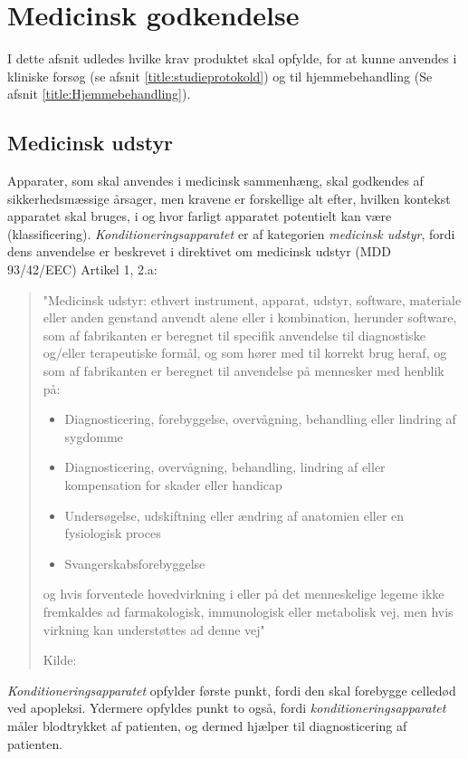 \section{Medicinsk godkendelse} \label{title:medGodkendelse}
I dette afsnit udledes hvilke krav produktet skal opfylde, for at kunne anvendes i kliniske forsøg (se afsnit \ref{title:studieprotokold}) og til hjemmebehandling (Se afsnit \ref{title:Hjemmebehandling}). 

\subsection{Medicinsk udstyr}
Apparater, som skal anvendes i medicinsk sammenhæng, skal godkendes af sikkerhedsmæssige årsager, men kravene er forskellige alt efter, hvilken kontekst apparatet skal bruges, i og hvor farligt apparatet potentielt kan være (klassificering). \textit{Konditioneringsapparatet} er af kategorien \textit{medicinsk udstyr}, fordi dens anvendelse er beskrevet i direktivet om medicinsk udstyr (MDD 93/42/EEC) Artikel 1, 2.a:

\begin{quote}
	"Medicinsk udstyr: ethvert instrument, apparat, udstyr, software,
	materiale eller anden genstand anvendt alene eller i kombination,
	herunder software, som af fabrikanten er beregnet til specifik anvendelse
	til diagnostiske og/eller terapeutiske formål, og som hører med
	til korrekt brug heraf, og som af fabrikanten er beregnet til anvendelse
	på mennesker med henblik på:
	\begin{itemize}
		\item Diagnosticering, forebyggelse, overvågning, behandling eller
		lindring af sygdomme
		\item Diagnosticering, overvågning, behandling, lindring af eller
		kompensation for skader eller handicap
		\item Undersøgelse, udskiftning eller ændring af anatomien eller en
		fysiologisk proces
		\item Svangerskabsforebyggelse
	\end{itemize}
	
	og hvis forventede hovedvirkning i eller på det menneskelige
	legeme ikke fremkaldes ad farmakologisk, immunologisk eller metabolisk
	vej, men hvis virkning kan understøttes ad denne vej"
	
	Kilde: \cite{Manual:4}
\end{quote}

\textit{Konditioneringsapparatet} opfylder første punkt, fordi den skal forebygge celledød ved apopleksi. Ydermere opfyldes punkt to også, fordi \textit{konditioneringsapparatet} måler blodtrykket af patienten, og dermed hjælper til diagnosticering af patienten.

